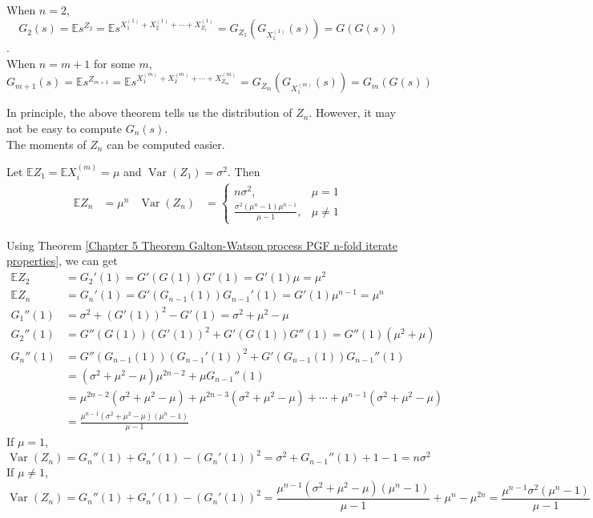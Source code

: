 \documentclass{huhtakm-template-book}
\newcommand{\expect}{\mathbb{E}}
\DeclareMathOperator{\Var}{Var}
\begin{document}
\begin{proofing}
    When $n=2$, 
    \begin{equation*}
        G_{2}(s)=\expect s^{Z_{2}}=\expect s^{X_{1}^{(1)}+X_{2}^{(1)}+\cdots+X_{Z_{1}}^{(1)}}=G_{Z_{1}}\left(G_{X_{1}^{(1)}}(s)\right)=G(G(s))
    \end{equation*}.\\
    When $n=m+1$ for some $m$,
    \begin{equation*}
        G_{m+1}(s)=\expect s^{Z_{m+1}}=\expect s^{X_{1}^{(m)}+X_{2}^{(m)}+\cdots+X_{Z_{m}}^{(m)}}=G_{Z_{m}}\left(G_{X_{1}^{(m)}}(s)\right)=G_{m}(G(s))
    \end{equation*}
\end{proofing}
In principle, the above theorem tells us the distribution of $Z_{n}$. However, it may not be easy to compute $G_{n}(s)$.\\
The moments of $Z_{n}$ can be computed easier.
\begin{lem}
    Let $\expect Z_{1}=\expect X_{i}^{(m)}=\mu$ and $\Var(Z_{1})=\sigma^{2}$. Then
    \begin{align*}
        \expect Z_{n}&=\mu^{n} & \Var(Z_{n})&=\begin{cases}
            n\sigma^{2}, &\mu=1\\
            \frac{\sigma^{2}(\mu^{n}-1)\mu^{n-1}}{\mu-1}, &\mu\neq 1
        \end{cases}
    \end{align*}
\end{lem}
\newpage
\begin{proofing}
    Using Theorem \ref{Chapter 5 Theorem Galton-Watson process PGF n-fold iterate properties}, we can get
    \begin{align*}
        \expect Z_{2}&=G_{2}'(1)=G'(G(1))G'(1)=G'(1)\mu=\mu^{2}\\
        \expect Z_{n}&=G_{n}'(1)=G'(G_{n-1}(1))G_{n-1}'(1)=G'(1)\mu^{n-1}=\mu^{n}\\
        G_{1}''(1)&=\sigma^{2}+(G'(1))^{2}-G'(1)=\sigma^{2}+\mu^{2}-\mu\\
        G_{2}''(1)&=G''(G(1))(G'(1))^{2}+G'(G(1))G''(1)=G''(1)(\mu^{2}+\mu)\\
        G_{n}''(1)&=G''(G_{n-1}(1))(G_{n-1}'(1))^{2}+G'(G_{n-1}(1))G_{n-1}''(1)\\
        &=(\sigma^{2}+\mu^{2}-\mu)\mu^{2n-2}+\mu G_{n-1}''(1)\\
        &=\mu^{2n-2}(\sigma^{2}+\mu^{2}-\mu)+\mu^{2n-3}(\sigma^{2}+\mu^{2}-\mu)+\cdots+\mu^{n-1}(\sigma^{2}+\mu^{2}-\mu)\\
        &=\frac{\mu^{n-1}(\sigma^{2}+\mu^{2}-\mu)(\mu^{n}-1)}{\mu-1}
    \end{align*}
    If $\mu=1$,
    \begin{equation*}
        \Var(Z_{n})=G_{n}''(1)+G_{n}'(1)-(G_{n}'(1))^{2}=\sigma^{2}+G_{n-1}''(1)+1-1=n\sigma^{2}
    \end{equation*}
    If $\mu\neq 1$,
    \begin{equation*}
        \Var(Z_{n})=G_{n}''(1)+G_{n}'(1)-(G_{n}'(1))^{2}=\frac{\mu^{n-1}(\sigma^{2}+\mu^{2}-\mu)(\mu^{n}-1)}{\mu-1}+\mu^{n}-\mu^{2n}=\frac{\mu^{n-1}\sigma^{2}(\mu^{n}-1)}{\mu-1}
    \end{equation*}
\end{proofing}
\end{document}
